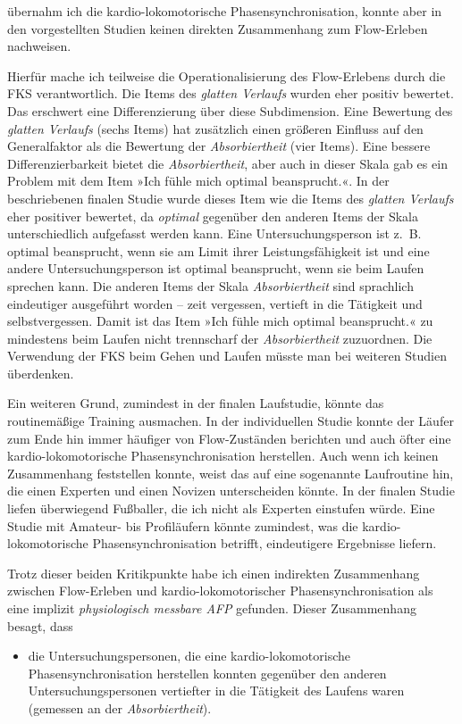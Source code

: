 übernahm ich die kardio-lokomotorische Phasensynchronisation, konnte aber in den vorgestellten Studien keinen direkten Zusammenhang zum Flow-Erleben nachweisen.

Hierfür mache ich teilweise die Operationalisierung des Flow-Erlebens durch die \ac{FKS} verantwortlich. Die Items des \emph{glatten Verlaufs} wurden eher positiv bewertet. Das erschwert eine Differenzierung über diese Subdimension. Eine Bewertung des \emph{glatten Verlaufs} (sechs Items) hat zusätzlich einen größeren Einfluss auf den Generalfaktor als die Bewertung der \emph{Absorbiertheit} (vier Items). Eine bessere Differenzierbarkeit bietet die \emph{Absorbiertheit}, aber auch in dieser Skala gab es ein Problem mit dem Item »Ich fühle mich optimal beansprucht.«. In der beschriebenen finalen Studie wurde dieses Item wie die Items des \emph{glatten Verlaufs} eher positiver bewertet, da \emph{optimal} gegenüber den anderen Items der Skala unterschiedlich aufgefasst werden kann. Eine Untersuchungsperson ist z.~B. optimal beansprucht, wenn sie am Limit ihrer Leistungsfähigkeit ist und eine andere Untersuchungsperson ist optimal beansprucht, wenn sie beim Laufen sprechen kann. Die anderen Items der Skala \emph{Absorbiertheit} sind sprachlich eindeutiger ausgeführt worden -- zeit vergessen, vertieft in die Tätigkeit und selbstvergessen. Damit ist das Item »Ich fühle mich optimal beansprucht.« zu mindestens beim Laufen nicht trennscharf der \emph{Absorbiertheit} zuzuordnen. Die Verwendung der \ac{FKS} beim Gehen und Laufen müsste man bei weiteren Studien überdenken.

Ein weiteren Grund, zumindest in der finalen Laufstudie, könnte das routinemäßige Training ausmachen. In der individuellen Studie konnte der Läufer zum Ende hin immer häufiger von Flow-Zuständen berichten und auch öfter eine kardio-lokomotorische Phasensynchronisation herstellen. Auch wenn ich keinen Zusammenhang feststellen konnte, weist das auf eine sogenannte Laufroutine hin, die einen Experten und einen Novizen unterscheiden könnte. In der finalen Studie liefen überwiegend Fußballer, die ich nicht als Experten einstufen würde. Eine Studie mit Amateur- bis Profiläufern könnte zumindest, was die kardio-lokomotorische Phasensynchronisation betrifft, eindeutigere Ergebnisse liefern.

Trotz dieser beiden Kritikpunkte habe ich einen indirekten Zusammenhang zwischen Flow-Erleben und kardio-lokomotorischer Phasensynchronisation als eine implizit \emph{physiologisch messbare \ac{AFP}} gefunden. Dieser Zusammenhang besagt, dass 
\begin{itemize}
	
	\item die Untersuchungspersonen, die eine kardio-lokomotorische Phasensynchronisation herstellen konnten gegenüber den anderen Untersuchungspersonen vertiefter in die Tätigkeit des Laufens waren (gemessen an der \emph{Absorbiertheit}).
\end{itemize}

